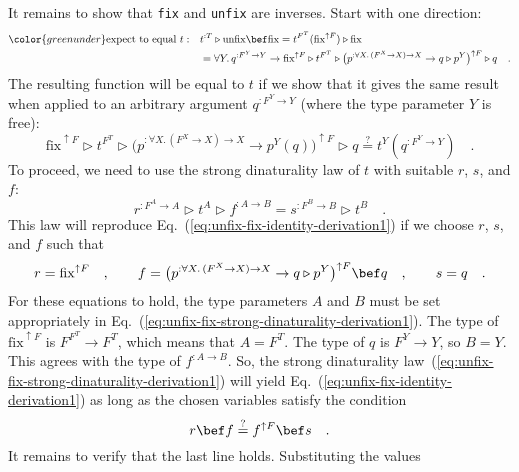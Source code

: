 It remains to show that \lstinline!fix!
and \lstinline!unfix! are
inverses. Start with one direction:
\begin{align*}
{\color{greenunder}\text{expect to equal }t:}\quad & t^{:T}\triangleright\text{unfix}\bef\text{fix}=t^{F^{T}}(\text{fix}^{\uparrow F})\triangleright\text{fix}\\
 & =\forall Y.\,q^{:F^{Y}\rightarrow Y}\rightarrow\text{fix}^{\uparrow F}\triangleright t^{F^{T}}\triangleright\big(p^{:\forall X.\,(F^{X}\rightarrow X)\rightarrow X}\rightarrow q\triangleright p^{Y}\big)^{\uparrow F}\triangleright q\quad.
\end{align*}
The resulting function will be equal to $t$ if we show that it gives
the same result when applied to an arbitrary argument $q^{:F^{Y}\rightarrow Y}$
(where the type parameter $Y$ is free):
\begin{equation}
\text{fix}^{\uparrow F}\triangleright t^{F^{T}}\triangleright\big(p^{:\forall X.\,(F^{X}\rightarrow X)\rightarrow X}\rightarrow p^{Y}(q)\big)^{\uparrow F}\triangleright q\overset{?}{=}t^{Y}(q^{:F^{Y}\rightarrow Y})\quad.\label{eq:unfix-fix-identity-derivation1}
\end{equation}
To proceed, we need to use the strong dinaturality law of $t$ with
suitable $r$, $s$, and $f$:
\begin{equation}
r^{:F^{A}\rightarrow A}\triangleright t^{A}\triangleright f^{:A\rightarrow B}=s^{:F^{B}\rightarrow B}\triangleright t^{B}\quad.\label{eq:unfix-fix-strong-dinaturality-derivation1}
\end{equation}
This law will reproduce Eq.~(\ref{eq:unfix-fix-identity-derivation1})
if we choose $r$, $s$, and $f$ such that
\[
r=\text{fix}^{\uparrow F}\quad,\quad\quad f=\big(p^{:\forall X.\,(F^{X}\rightarrow X)\rightarrow X}\rightarrow q\triangleright p^{Y}\big)^{\uparrow F}\bef q\quad,\quad\quad s=q\quad.
\]
For these equations to hold, the type parameters $A$ and $B$ must
be set appropriately in Eq.~(\ref{eq:unfix-fix-strong-dinaturality-derivation1}).
The type of $\text{fix}^{\uparrow F}$ is $F^{F^{T}}\rightarrow F^{T}$,
which means that $A=F^{T}$. The type of $q$ is $F^{Y}\rightarrow Y$,
so $B=Y$. This agrees with the type of $f^{:A\rightarrow B}$. So,
the strong dinaturality law~(\ref{eq:unfix-fix-strong-dinaturality-derivation1})
will yield Eq.~(\ref{eq:unfix-fix-identity-derivation1}) as long
as the chosen variables satisfy the condition
\[
r\bef f\overset{?}{=}f^{\uparrow F}\bef s\quad.
\]
It remains to verify that the last line holds. Substituting the values
